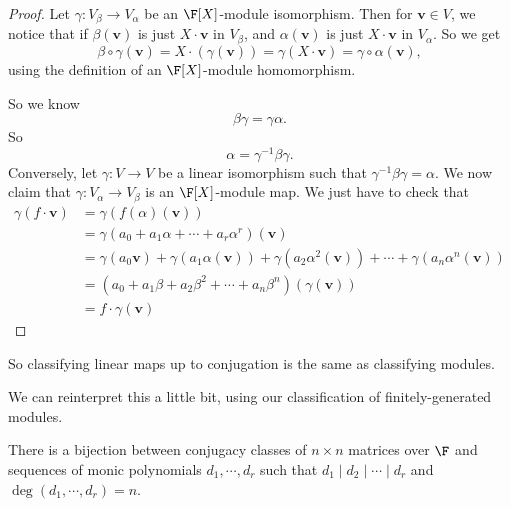 \documentclass[a4paper]{article}
\begin{document}
\begin{proof}
  Let $\gamma: V_\beta \to V_\alpha$ be an $\F[X]$-module isomorphism. Then for $\mathbf{v} \in V$, we notice that if $\beta (\mathbf{v})$ is just $X \cdot \mathbf{v}$ in $V_\beta$, and $\alpha(\mathbf{v})$ is just $X \cdot \mathbf{v}$ in $V_\alpha$. So we get
  \[
    \beta \circ \gamma(\mathbf{v}) = X \cdot (\gamma(\mathbf{v})) = \gamma(X \cdot \mathbf{v}) = \gamma \circ \alpha(\mathbf{v}),
  \]
  using the definition of an $\F[X]$-module homomorphism.

  So we know
  \[
    \beta\gamma = \gamma\alpha.
  \]
  So
  \[
    \alpha = \gamma^{-1}\beta\gamma.
  \]
  Conversely, let $\gamma: V \to V$ be a linear isomorphism such that $\gamma^{-1}\beta\gamma = \alpha$. We now claim that $\gamma: V_\alpha \to V_\beta$ is an $\F[X]$-module map. We just have to check that
  \begin{align*}
    \gamma(f \cdot \mathbf{v}) &= \gamma(f(\alpha)(\mathbf{v})) \\
    &= \gamma(a_0 + a_1 \alpha + \cdots + a_r \alpha^r) (\mathbf{v})\\
    &= \gamma(a_0 \mathbf{v}) + \gamma(a_1 \alpha(\mathbf{v})) + \gamma (a_2 \alpha^2 (\mathbf{v})) + \cdots + \gamma(a_n \alpha^n(\mathbf{v}))\\
    &= (a_0 + a_1 \beta + a_2 \beta^2 + \cdots + a_n \beta^n)(\gamma(\mathbf{v}))\\
    &= f\cdot \gamma(\mathbf{v})
  \end{align*}
\end{proof}
So classifying linear maps up to conjugation is the same as classifying modules.

We can reinterpret this a little bit, using our classification of finitely-generated modules.
\begin{cor}
  There is a bijection between conjugacy classes of $n \times n$ matrices over $\F$ and sequences of monic polynomials $d_1, \cdots, d_r$ such that $d_1 \mid d_2 \mid \cdots \mid d_r$ and $\deg (d_1,\cdots, d_r) = n$.
\end{cor}
\end{document}
